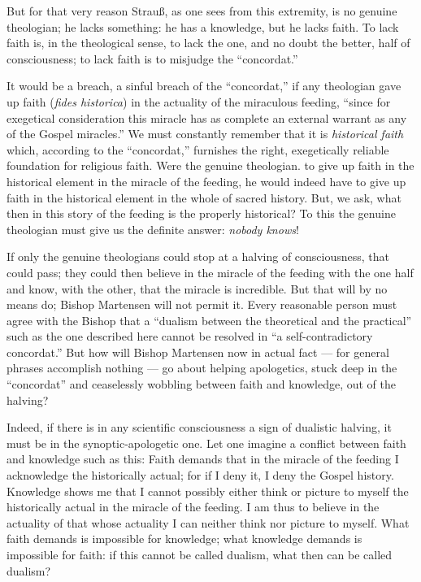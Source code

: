\documentclass[12pt]{book}
\newcommand{\opage}[1]{\marginnote{\footnotesize\textit{[#1]}}}
\begin{document}
But for that very reason Strauß, as one sees from this extremity, is no genuine theologian; he lacks something: he has a knowledge, but he lacks faith. To lack faith is, in the theological sense, to lack the one, and no doubt the better, half of consciousness; to lack faith is to misjudge the ``concordat.''

\opage{72}\setcounter{footnote}{0}%
It would be a breach, a sinful breach of the ``concordat,'' if any theologian gave up faith (\textit{fides historica}) in the actuality of the miraculous feeding, ``since for exegetical consideration this miracle has as complete an external warrant as any of the Gospel miracles.'' We must constantly remember that it is \emph{historical faith} which, according to the ``concordat,'' furnishes the right, exegetically reliable foundation for religious faith. Were the genuine theologian. to give up faith in the historical element in the miracle of the feeding, he would indeed have to give up faith in the historical element in the whole of sacred history. But, we ask, what then in this story of the feeding is the properly historical? To this the genuine theologian must give us the definite answer: \emph{nobody knows}!

If only the genuine theologians could stop at a halving of consciousness, that could pass; they could then believe in the miracle of the feeding with the one half and know, with the other, that the miracle is incredible. But that will by no means do; Bishop Martensen will not permit it. Every reasonable person must agree with the Bishop that a ``dualism between the theoretical and the practical'' such as the one described here cannot be resolved in ``a self-contradictory concordat.'' But how will Bishop Martensen now in actual fact --- for general phrases accomplish nothing --- go about helping apologetics, stuck deep in the ``concordat'' and ceaselessly wobbling between faith and knowledge, out of the halving?

Indeed, if there is in any scientific consciousness a sign of dualistic halving, it must be in the synoptic-apologetic one. Let one imagine a conflict between faith and knowledge such as this: Faith demands that in the miracle of the feeding I acknowledge the historically actual; for if I deny it, I deny the Gospel history. Knowledge shows me that I cannot possibly either think or picture to myself the historically actual in the miracle of the feeding. I am thus to believe in
\opage{73}\setcounter{footnote}{0}%
the actuality of that whose actuality I can neither think nor picture to myself. What faith demands is impossible for knowledge; what knowledge demands is impossible for faith: if this cannot be called dualism, what then can be called dualism?
\end{document}
